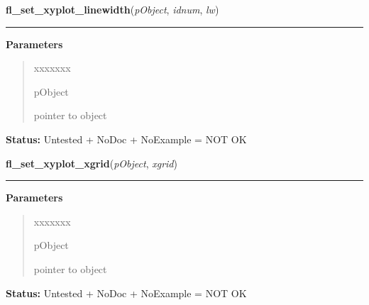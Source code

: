 \hspace{.8\funcindent}\begin{boxedminipage}{\funcwidth}

    \raggedright \textbf{fl\_set\_xyplot\_linewidth}(\textit{pObject}, \textit{idnum}, \textit{lw})

    \vspace{-1.5ex}

    \rule{\textwidth}{0.5\fboxrule}
\setlength{\parskip}{2ex}
\setlength{\parskip}{1ex}
      \textbf{Parameters}
      \vspace{-1ex}

      \begin{quote}
        \begin{Ventry}{xxxxxxx}

          \item[pObject]

          pointer to object

        \end{Ventry}

      \end{quote}

\textbf{Status:} Untested + NoDoc + NoExample = NOT OK



    \end{boxedminipage}

    \label{xformslib:library:fl_set_xyplot_xgrid}

    \vspace{0.5ex}

\hspace{.8\funcindent}\begin{boxedminipage}{\funcwidth}

    \raggedright \textbf{fl\_set\_xyplot\_xgrid}(\textit{pObject}, \textit{xgrid})

    \vspace{-1.5ex}

    \rule{\textwidth}{0.5\fboxrule}
\setlength{\parskip}{2ex}
\setlength{\parskip}{1ex}
      \textbf{Parameters}
      \vspace{-1ex}

      \begin{quote}
        \begin{Ventry}{xxxxxxx}

          \item[pObject]

          pointer to object

        \end{Ventry}

      \end{quote}

\textbf{Status:} Untested + NoDoc + NoExample = NOT OK



    \end{boxedminipage}

